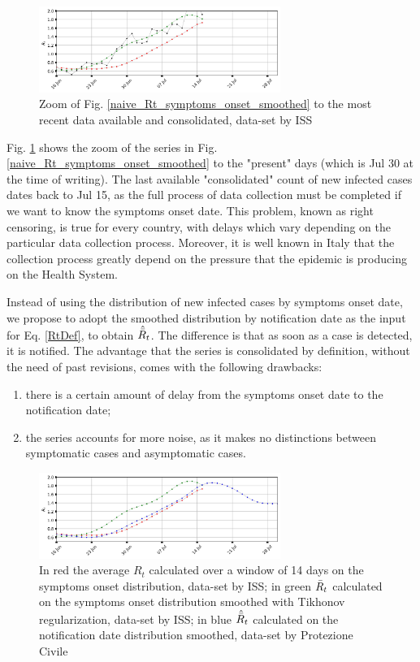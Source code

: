 \documentclass[graybox]{svmult}
\begin{document}
\begin{figure}[t]
\center
\includegraphics[width=0.7\textwidth]{Rt_images/naive_Rt_symptoms_onset_smoothed_zoom.jpg}
\caption{Zoom of Fig. \ref{naive_Rt_symptoms_onset_smoothed} to the most recent data available and consolidated, data-set by ISS}
\label{naive_Rt_symptoms_onset_smoothed_zoom}
\end{figure}

Fig. \ref{naive_Rt_symptoms_onset_smoothed_zoom} shows the zoom of the series in Fig. \ref{naive_Rt_symptoms_onset_smoothed} to the "present" days (which is Jul 30 at the time of writing). The last available "consolidated" count of new infected cases dates back to Jul 15, as the full process of data collection must be completed if we want to know the symptoms onset date. This problem, known as right censoring, is true for every country, with delays which vary depending on the particular data collection process. Moreover, it is well known in Italy that the collection process greatly depend on the pressure that the epidemic is producing on the Health System.

Instead of using the distribution of new infected cases by symptoms onset date, we propose to adopt the smoothed distribution by notification date as the input for Eq. \ref{RtDef}, to obtain $\hat{\Bar{R}}_{t}$. The difference is that as soon as a case is detected, it is notified. The advantage that the series is consolidated by definition, without the need of past revisions, comes with the following drawbacks:
\begin{enumerate}
    \item there is a certain amount of delay from the symptoms onset date to the notification date;
    \item the series accounts for more noise, as it makes no distinctions between symptomatic cases and asymptomatic cases.
\end{enumerate}

\begin{figure}[t]
\center
\includegraphics[width=0.7\textwidth]{Rt_images/naive_Rt_symptoms_onset_vs_notification.jpg}
\caption{In red the average $R_t$ calculated over a window of 14 days on the symptoms onset distribution, data-set by ISS; in green $\Bar{R}_{t}$ calculated on the symptoms onset distribution smoothed with Tikhonov regularization, data-set by ISS; in blue $\hat{\Bar{R}}_{t}$ calculated on the notification date distribution smoothed, data-set by Protezione Civile}
\label{naive_Rt_symptoms_onset_vs_notification}
\end{figure}
\end{document}
